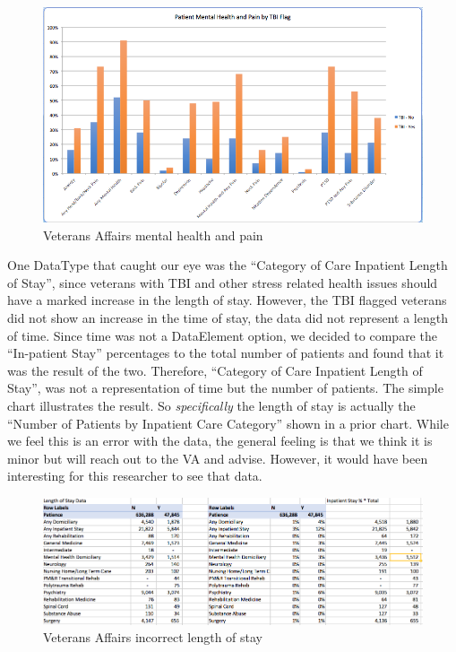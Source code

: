 \documentclass[sigconf]{acmart}
\begin{document}
\begin{figure}[h]
\includegraphics[width=\columnwidth]{images/graph6.png}
\caption{Veterans Affairs mental health and pain}\label{f:Veterans Affairs mental health and pain}
\end{figure}

One DataType that caught our eye was the ``Category of Care Inpatient Length of Stay'', since veterans with TBI and other stress related health issues should have a marked increase in the length of stay.  However, the TBI flagged veterans did not show an increase in the time of stay, the data did not represent a length of time.  Since time was not a DataElement option, we decided to compare the ``In-patient Stay'' percentages to the total number of patients and found that it was the result of the two.  Therefore, ``Category of Care Inpatient Length of Stay'', was not a representation of time but the number of patients.  The simple chart illustrates the result.  So {\em specifically} the length of stay is actually the ``Number of Patients by Inpatient Care Category'' shown in a prior chart. While we feel this is an error with the data, the general feeling is that we think it is minor but will reach out to the VA and advise.  However, it would have been interesting for this researcher to see that data.


\begin{figure}[h]
\includegraphics[width=\columnwidth]{images/graph7.png}
\caption{Veterans Affairs incorrect length of stay}\label{f:Veterans Affairs incorrect length of stay}
\end{figure}
\end{document}
